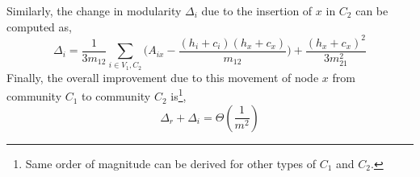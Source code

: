 Similarly, the change in modularity $\Delta_i$ due to the insertion of $x$ in
$C_2$ can be computed as,
\vspace{-0.05in}
\begin{dmath*}\label{final6}
\Delta_{i} =
 \frac{1}{3m_{12}}
 \sum_{i \in V_1, C_2}\big(A_{ix} - \frac{ (h_i+c_i)(h_x+c_x)}{m_{12}}\big)+\frac{ (h_x+c_x)^2}{3m_{21}^2}
\end{dmath*}
\vspace{-0.05in}
Finally, the overall improvement due to this movement of node $x$ from
community $C_1$ to community $C_2$ is\footnote{Same order of magnitude can
be derived for other types of $C_1$ and $C_2$.},
\vspace{-0.05in}
\begin{dmath*}\label{final7}
\Delta_{r}+\Delta_{i} = \Theta(\frac{1}{m^2})
\end{dmath*}
\vspace{-0.05in}


